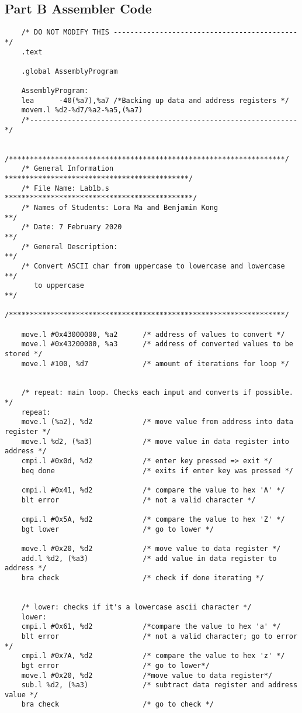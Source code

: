 \documentclass[10pt, letterpaper, titlepage]{article} %
\begin{document}
\subsection{Part B Assembler Code}
\begin{lstlisting}
	/* DO NOT MODIFY THIS --------------------------------------------*/
	.text
	
	.global AssemblyProgram
	
	AssemblyProgram:
	lea      -40(%a7),%a7 /*Backing up data and address registers */
	movem.l %d2-%d7/%a2-%a5,(%a7)
	/*----------------------------------------------------------------*/
	
	/******************************************************************/
	/* General Information ********************************************/
	/* File Name: Lab1b.s *********************************************/
	/* Names of Students: Lora Ma and Benjamin Kong                   **/
	/* Date: 7 February 2020                                         **/
	/* General Description:                                          **/
	/* Convert ASCII char from uppercase to lowercase and lowercase  **/
	   to uppercase                                                  **/
	/******************************************************************/
	
	move.l #0x43000000, %a2      /* address of values to convert */
	move.l #0x43200000, %a3      /* address of converted values to be stored */
	move.l #100, %d7             /* amount of iterations for loop */
	
	
	/* repeat: main loop. Checks each input and converts if possible. */
	repeat:
	move.l (%a2), %d2            /* move value from address into data register */
	move.l %d2, (%a3)            /* move value in data register into address */
	cmpi.l #0x0d, %d2            /* enter key pressed => exit */
	beq done                     /* exits if enter key was pressed */
	
	cmpi.l #0x41, %d2            /* compare the value to hex 'A' */
	blt error                    /* not a valid character */
	
	cmpi.l #0x5A, %d2            /* compare the value to hex 'Z' */
	bgt lower                    /* go to lower */
	
	move.l #0x20, %d2            /* move value to data register */
	add.l %d2, (%a3)             /* add value in data register to address */
	bra check                    /* check if done iterating */
	
	
	/* lower: checks if it's a lowercase ascii character */
	lower:
	cmpi.l #0x61, %d2            /*compare the value to hex 'a' */
	blt error                    /* not a valid character; go to error */
	cmpi.l #0x7A, %d2            /* compare the value to hex 'z' */
	bgt error                    /* go to lower*/
	move.l #0x20, %d2            /*move value to data register*/
	sub.l %d2, (%a3)             /* subtract data register and address value */
	bra check                    /* go to check */
	

\end{lstlisting}
\end{document}
